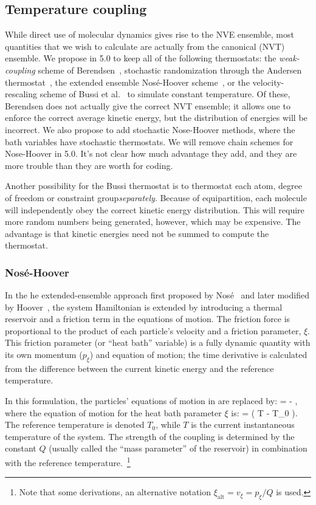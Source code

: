 \documentclass[11pt,a4paper,twoside]{article}
\begin{document}
\subsection{Temperature coupling}

While direct use of molecular dynamics gives rise to the NVE ensemble,
most quantities that we wish to calculate are actually from the
canonical (NVT) ensemble. We propose in 5.0 to keep all of the
following thermostats: the {\em weak-coupling} scheme of
Berendsen~\cite{Berendsen84}, stochastic randomization through the
Andersen thermostat~\cite{Andersen80}, the extended ensemble
Nos{\'e}-Hoover scheme~\cite{Nose84,Hoover85}, or the
velocity-rescaling scheme of Bussi et al.~\cite{Bussi2007a} to
simulate constant temperature.  Of these, Berendsen does not actually
give the correct NVT ensemble; it allows one to enforce the correct
average kinetic energy, but the distribution of energies will be
incorrect.  We also propose to add stochastic Nose-Hoover methods,
where the bath variables have stochastic thermostats. We will remove
chain schemes for Nose-Hoover in 5.0. It's not clear how much
advantage they add, and they are more trouble than they are worth for
coding.

Another possibility for the Bussi thermostat is to thermostat each
atom, degree of freedom or constraint group{\em separately}. Because
of equipartition, each molecule will independently obey the correct
kinetic energy distribution.  This will require more random numbers
being generated, however, which may be expensive. The advantage is
that kinetic energies need not be summed to compute the thermostat. 

\subsubsection{Nos\'{e}-Hoover}
In the he extended-ensemble approach first proposed by
Nos{\'e}~\cite{Nose84} and later modified by Hoover~\cite{Hoover85},
the system Hamiltonian is extended by introducing a thermal reservoir
and a friction term in the equations of motion.  The friction force is
proportional to the product of each particle's velocity and a friction
parameter, $\xi$.  This friction parameter (or ``heat bath'' variable)
is a fully dynamic quantity with its own momentum ($p_{\xi}$) and
equation of motion; the time derivative is calculated from the
difference between the current kinetic energy and the reference
temperature.

In this formulation, the particles' equations of motion in
 are replaced by:
\beq
{} =  - 
 ,
\label{eqn:NH-eqn-of-motion}
\eeq where the equation of motion for the heat bath parameter $\xi$ is:
\beq {} = \left( T - T_0 \right).  \eeq The
reference temperature is denoted $T_0$, while $T$ is the current
instantaneous temperature of the system. The strength of the coupling
is determined by the constant $Q$ (usually called the ``mass parameter''
of the reservoir) in combination with the reference
temperature.~\footnote{Note that some derivations, an alternative
  notation $\xi_{\mathrm{alt}} = v_{\xi} = p_{\xi}/Q$ is used.}
\end{document}
